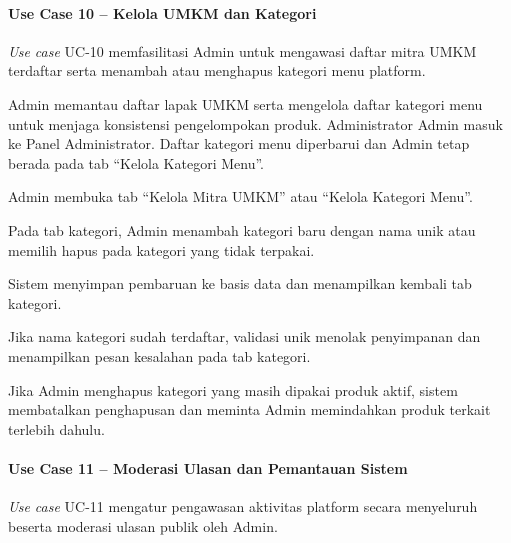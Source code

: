 \paragraph{Use Case 10 -- Kelola UMKM dan Kategori}
\textit{Use case} UC-10 memfasilitasi Admin untuk mengawasi daftar mitra UMKM terdaftar serta menambah atau menghapus kategori menu platform.

{Admin memantau daftar lapak UMKM serta mengelola daftar kategori menu untuk menjaga konsistensi pengelompokan produk.}
{Administrator}
{Admin masuk ke Panel Administrator.}
{Daftar kategori menu diperbarui dan Admin tetap berada pada tab ``Kelola Kategori Menu''.}
{\begin{uclist}
  \item Admin membuka tab ``Kelola Mitra UMKM'' atau ``Kelola Kategori Menu''.
  \item Pada tab kategori, Admin menambah kategori baru dengan nama unik atau memilih hapus pada kategori yang tidak terpakai.
  \item Sistem menyimpan pembaruan ke basis data dan menampilkan kembali tab kategori.
\end{uclist}}
{\begin{ucbullet}
  \item Jika nama kategori sudah terdaftar, validasi unik menolak penyimpanan dan menampilkan pesan kesalahan pada tab kategori.
  \item Jika Admin menghapus kategori yang masih dipakai produk aktif, sistem membatalkan penghapusan dan meminta Admin memindahkan produk terkait terlebih dahulu.
\end{ucbullet}}

\paragraph{Use Case 11 -- Moderasi Ulasan dan Pemantauan Sistem}
\textit{Use case} UC-11 mengatur pengawasan aktivitas platform secara menyeluruh beserta moderasi ulasan publik oleh Admin.

